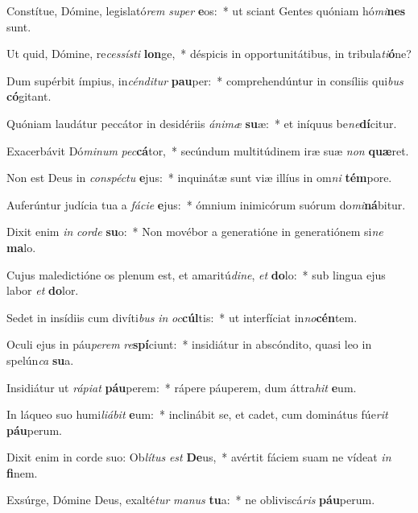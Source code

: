 \item Constítue, Dómine, legislató\textit{rem} \textit{su}\textit{per} \textbf{e}os:~* ut sciant Gentes quóniam hó\textit{mi}\textbf{nes} sunt.
\item Ut quid, Dómine, re\textit{ces}\textit{sís}\textit{ti} \textbf{lon}ge,~* déspicis in opportunitátibus, in tribula\textit{ti}\textbf{ó}ne?
\item Dum supérbit ímpius, in\textit{cén}\textit{di}\textit{tur} \textbf{pau}per:~* comprehendúntur in consíliis qui\textit{bus} \textbf{có}gitant.
\item Quóniam laudátur peccátor in desidériis \textit{á}\textit{ni}\textit{mæ} \textbf{su}æ:~* et iníquus be\textit{ne}\textbf{dí}citur.
\item Exacerbávit Dó\textit{mi}\textit{num} \textit{pec}\textbf{cá}tor,~* secúndum multitúdinem iræ suæ \textit{non} \textbf{quæ}ret.
\item Non est Deus in \textit{con}\textit{spéc}\textit{tu} \textbf{e}jus:~* inquinátæ sunt viæ illíus in om\textit{ni} \textbf{tém}pore.
\item Auferúntur judícia tua a \textit{fá}\textit{ci}\textit{e} \textbf{e}jus:~* ómnium inimicórum suórum do\textit{mi}\textbf{ná}bitur.
\item Dixit enim \textit{in} \textit{cor}\textit{de} \textbf{su}o:~* Non movébor a generatióne in generatiónem si\textit{ne} \textbf{ma}lo.
\item Cujus maledictióne os plenum est, et amaritú\textit{di}\textit{ne}, \textit{et} \textbf{do}lo:~* sub lingua ejus labor \textit{et} \textbf{do}lor.
\item Sedet in insídiis cum divíti\textit{bus} \textit{in} \textit{oc}\textbf{cúl}tis:~* ut interfíciat in\textit{no}\textbf{cén}tem.
\item Oculi ejus in páu\textit{pe}\textit{rem} \textit{re}\textbf{spí}ciunt:~* insidiátur in abscóndito, quasi leo in spelún\textit{ca} \textbf{su}a.
\item Insidiátur ut \textit{rá}\textit{pi}\textit{at} \textbf{páu}perem:~* rápere páuperem, dum áttra\textit{hit} \textbf{e}um.
\item In láqueo suo humi\textit{li}\textit{á}\textit{bit} \textbf{e}um:~* inclinábit se, et cadet, cum dominátus fúe\textit{rit} \textbf{páu}perum.
\item Dixit enim in corde suo: Ob\textit{lí}\textit{tus} \textit{est} \textbf{De}us,~* avértit fáciem suam ne vídeat \textit{in} \textbf{fi}nem.
\item Exsúrge, Dómine Deus, exalté\textit{tur} \textit{ma}\textit{nus} \textbf{tu}a:~* ne obliviscá\textit{ris} \textbf{páu}perum.
